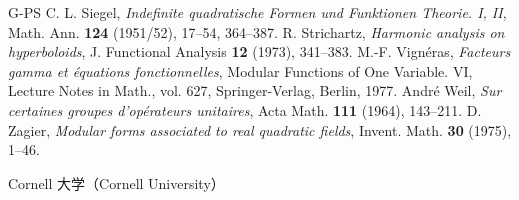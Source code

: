 \begin{thebibliography}{G-PS}
 C. L. Siegel, \emph{Indefinite quadratische Formen und Funktionen Theorie. I, II}, Math. Ann. \textbf{124} (1951/52), 17--54, 364--387.
 R. Strichartz, \emph{Harmonic analysis on hyperboloids}, J. Functional Analysis \textbf{12} (1973), 341--383.
 M.-F. Vignéras, \emph{Facteurs gamma et équations fonctionnelles}, Modular Functions of One Variable. VI, Lecture Notes in Math., vol. 627, Springer-Verlag, Berlin, 1977.
 André Weil, \emph{Sur certaines groupes d'opérateurs unitaires}, Acta Math. \textbf{111} (1964), 143--211.
 D. Zagier, \emph{Modular forms associated to real quadratic fields}, Invent. Math. \textbf{30} (1975), 1--46.
\end{thebibliography}
\noindent Cornell 大学（Cornell University）
